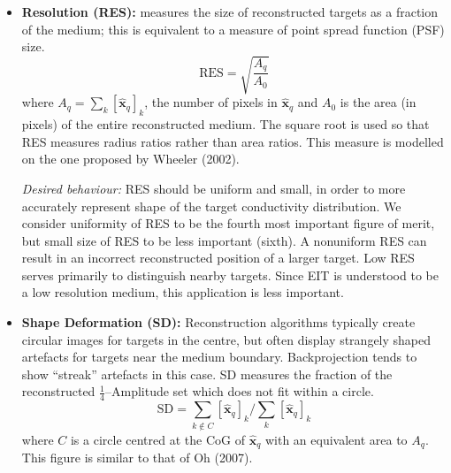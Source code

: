 \documentclass[12pt]{iopart}
\newcommand{\xH}{\mbox{$\mathbf{\hat x}$}}
\begin{document}
\begin{itemize}
\hspace{5mm}
{\em Desired behaviour:}
PE should be small and show small variability for
targets at different radial positions. We consider
small and constant PE to be the second most important
figure of merit. If PE is variable, interpretation
of a distribution of air in the lungs becomes unreliable.
Sheffield backprojection has large PE near the
electrodes; this has resulted in cases where changes at
the electrodes are misinterpreted as being inside the body.

\item
{\bf Resolution (RES):}
measures the size of reconstructed targets as a fraction
of the medium; this is
equivalent to a measure of point spread function (PSF) size.
\begin{equation}
\mathrm{RES} = \sqrt{
 \frac{ A_q }
      { A_0 }
 }
\end{equation}
where $A_q =  \sum_k [\xH_q]_k$, the number
of pixels in $\xH_q$ and 
$A_0$ is the area (in pixels) of
the entire reconstructed medium. The square root is used 
so that RES measures radius ratios rather than area ratios.
This measure is modelled on the one proposed by
Wheeler \etal (2002).

\hspace{5mm}
{\em Desired behaviour:}
RES should be uniform and small, in order to 
more accurately represent shape of the target conductivity
distribution. We consider uniformity of RES to be the
fourth most important figure of merit, but small size
of RES to be less important (sixth). A nonuniform
RES can result in an incorrect reconstructed 
position of a larger target. Low RES serves primarily
to distinguish nearby targets. Since EIT is understood to
be a low resolution medium, this application is less important.

\item
{\bf Shape Deformation (SD):}
Reconstruction algorithms typically create circular
images for targets in the centre, but often display 
strangely shaped artefacts for targets near the medium
boundary. Backprojection tends to show ``streak''
artefacts in this case.
SD measures the fraction of the reconstructed
$\frac{1}{4}$--Amplitude set which does not
fit within a circle.
\begin{equation}
\mathrm{SD} = \sum_{k\not\in C} [\xH_q]_k / 
              \sum_{k} [\xH_q]_k
\end{equation}
where $C$ is a circle centred at the CoG of $\xH_q$
with an equivalent area to $A_q$. This figure
is similar to that of Oh \etal (2007).


\end{itemize}
\end{document}

